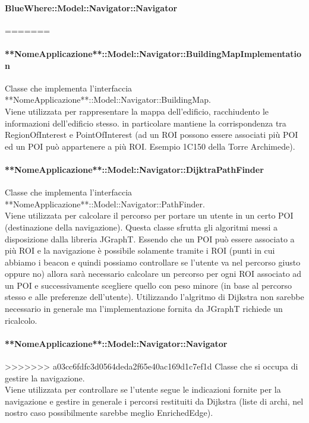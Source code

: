 \documentclass[../SpecificaTecnica.tex]{subfiles}
\begin{document}
				\paragraph{BlueWhere::Model::Navigator::Navigator}
=======
				\paragraph{**NomeApplicazione**::Model::Navigator::BuildingMapImplementation}
					Classe che implementa l'interfaccia **NomeApplicazione**::Model::Navigator::BuildingMap. \\
					Viene utilizzata per rappresentare la mappa dell'edificio, racchiudento le informazioni dell'edificio stesso. in particolare mantiene la corrispondenza tra RegionOfInterest e PointOfInterest (ad un ROI possono essere associati più POI ed un POI può appartenere a più ROI. Esempio 1C150 della Torre Archimede). 
				\paragraph{**NomeApplicazione**::Model::Navigator::DijktraPathFinder}
					Classe che implementa l'interfaccia **NomeApplicazione**::Model::Navigator::PathFinder. \\
					Viene utilizzata per calcolare il percorso per portare un utente in un certo POI (destinazione della navigazione). Questa classe sfrutta gli algoritmi messi a disposizione dalla libreria JGraphT. Essendo che un POI può essere associato a più ROI e la navigazione è possibile solamente tramite i ROI (punti in cui abbiamo i beacon e quindi possiamo controllare se l'utente va nel percorso giusto oppure no) allora sarà necessario calcolare un percorso per ogni ROI associato ad un POI e successivamente scegliere quello con peso minore (in base al percorso stesso e alle preferenze dell'utente). Utilizzando l'algritmo di Dijkstra non sarebbe necessario in generale ma l'implementazione fornita da JGraphT richiede un ricalcolo.
				\paragraph{**NomeApplicazione**::Model::Navigator::Navigator}
>>>>>>> a03cc6fdfc3d0564deda2f65e40ac169d1c7ef1d
					Classe che si occupa di gestire la navigazione. \\
					Viene utilizzata per controllare se l'utente segue le indicazioni fornite per la navigazione e gestire in generale i percorsi restituiti da Dijkstra (liste di archi, nel nostro caso possibilmente sarebbe meglio EnrichedEdge).
\end{document}
